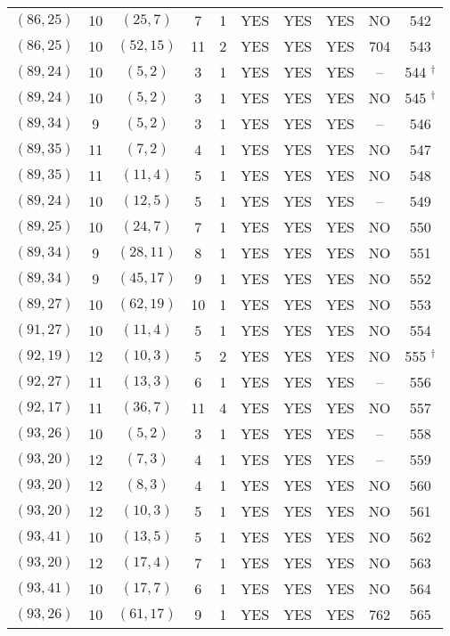 \begin{longtable}{|c|c|c|c|c|c|c|c|c|c|}
$(86, 25)$ & 10 & $(25, 7)$ & 7 & 1 & YES & YES & YES & NO & 542\\
$(86, 25)$ & 10 & $(52, 15)$ & 11 & 2 & YES & YES & YES & 704 & 543\\
$(89, 24)$ & 10 & $(5, 2)$ & 3 & 1 & YES & YES & YES & -- & 544 ${}^\dagger$\\
$(89, 24)$ & 10 & $(5, 2)$ & 3 & 1 & YES & YES & YES & NO & 545 ${}^\dagger$\\
$(89, 34)$ & 9 & $(5, 2)$ & 3 & 1 & YES & YES & YES & -- & 546\\
$(89, 35)$ & 11 & $(7, 2)$ & 4 & 1 & YES & YES & YES & NO & 547\\
$(89, 35)$ & 11 & $(11, 4)$ & 5 & 1 & YES & YES & YES & NO & 548\\
$(89, 24)$ & 10 & $(12, 5)$ & 5 & 1 & YES & YES & YES & -- & 549\\
$(89, 25)$ & 10 & $(24, 7)$ & 7 & 1 & YES & YES & YES & NO & 550\\
$(89, 34)$ & 9 & $(28, 11)$ & 8 & 1 & YES & YES & YES & NO & 551\\
$(89, 34)$ & 9 & $(45, 17)$ & 9 & 1 & YES & YES & YES & NO & 552\\
$(89, 27)$ & 10 & $(62, 19)$ & 10 & 1 & YES & YES & YES & NO & 553\\
$(91, 27)$ & 10 & $(11, 4)$ & 5 & 1 & YES & YES & YES & NO & 554\\
$(92, 19)$ & 12 & $(10, 3)$ & 5 & 2 & YES & YES & YES & NO & 555 ${}^\dagger$\\
$(92, 27)$ & 11 & $(13, 3)$ & 6 & 1 & YES & YES & YES & -- & 556\\
$(92, 17)$ & 11 & $(36, 7)$ & 11 & 4 & YES & YES & YES & NO & 557\\
$(93, 26)$ & 10 & $(5, 2)$ & 3 & 1 & YES & YES & YES & -- & 558\\
$(93, 20)$ & 12 & $(7, 3)$ & 4 & 1 & YES & YES & YES & -- & 559\\
$(93, 20)$ & 12 & $(8, 3)$ & 4 & 1 & YES & YES & YES & NO & 560\\
$(93, 20)$ & 12 & $(10, 3)$ & 5 & 1 & YES & YES & YES & NO & 561\\
$(93, 41)$ & 10 & $(13, 5)$ & 5 & 1 & YES & YES & YES & NO & 562\\
$(93, 20)$ & 12 & $(17, 4)$ & 7 & 1 & YES & YES & YES & NO & 563\\
$(93, 41)$ & 10 & $(17, 7)$ & 6 & 1 & YES & YES & YES & NO & 564\\
$(93, 26)$ & 10 & $(61, 17)$ & 9 & 1 & YES & YES & YES & 762 & 565\\

\end{longtable}

